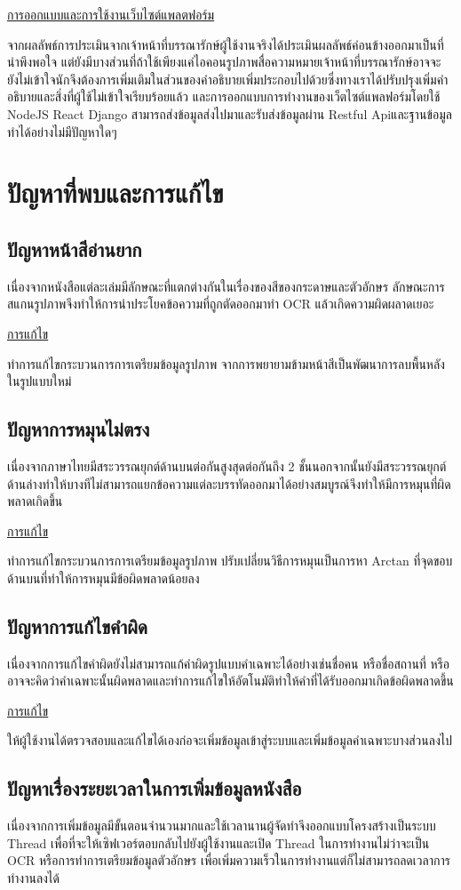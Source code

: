 \underline{การออกแบบและการใช้งานเว็บไซต์แพลตฟอร์ม}

จากผลลัพธ์การประเมินจากเจ้าหน้าที่บรรณารักษ์ผู้ใช้งานจริงได้ประเมินผลลัพธ์ค่อนข้างออกมาเป็นที่น่าพึงพอใจ แต่ยังมีบางส่วนที่ถ้าใช้เพียงแค่ไอคอนรูปภาพสื่อความหมายเจ้าหน้าที่บรรณารักษ์อาจจะ
ยังไม่เข้าใจนักจึงต้องการเพิ่มเติมในส่วนของคำอธิบายเพิ่มประกอบไปด้วยซึ่งทางเราได้ปรับปรุงเพิ่มคำอธิบายและสิ่งที่ผู้ใช้ไม่เข้าใจเรียบร้อยแล้ว
และการออกแบบการทำงานของเว็ตไซต์แพลฟอร์มโดยใช้ NodeJS React Django สามารถส่งข้อมูลส่งไปมาและรับส่งข้อมูลผ่าน Restful Apiและฐานข้อมูลทำได้อย่างไม่มีปัญหาใดๆ

\section{ปัญหาที่พบและการแก้ไข}
\subsection{ปัญหาหน้าสีอ่านยาก}
เนื่องจากหนังสือแต่ละเล่มมีลักษณะที่แตกต่างกันในเรื่องของสีของกระดาษและตัวอักษร ลักษณะการสแกนรูปภาพจึงทำให้การนำประโยคข้อความที่ถูกตัดออกมาทำ OCR แล้วเกิดความผิดผลาดเยอะ

\underline{การแก้ไข}

	ทำการแก้ไขกระบวนการการเตรียมข้อมูลรูปภาพ จากการพยายามข้ามหน้าสีเป็นพัฒนาการลบพื้นหลังในรูปแบบใหม่
\subsection{ปัญหาการหมุนไม่ตรง}
เนื่องจากภาษาไทยมีสระวรรณยุกต์ด้านบนต่อกันสูงสุดต่อกันถึง 2 ชั้นนอกจากนั้นยังมีสระวรรณยุกต์ด้านล่างทำให้บางทีไม่สามารถแยกข้อความแต่ละบรรทัดออกมาได้อย่างสมบูรณ์จึงทำให้มีการหมุนที่ผิดพลาดเกิดขึ้น

\underline{การแก้ไข}

	ทำการแก้ไขกระบวนการการเตรียมข้อมูลรูปภาพ ปรับเปลี่ยนวิธีการหมุนเป็นการหา Arctan ที่จุดขอบด้านบนที่ทำให้การหมุนมีข้อผิดพลาดน้อยลง
\subsection{ปัญหาการแก้ไขคำผิด}
เนื่องจากการแก้ไขคำผิดยังไม่สามารถแก้คำผิดรูปแบบคำเฉพาะได้อย่างเช่นชื่อคน หรือชื่อสถานที่ หรืออาจจะคิดว่าคำเฉพาะนั้นผิดพลาดและทำการแก้ไขให้อัตโนมัติทำให้คำที่ได้รับออกมาเกิดข้อผิดพลาดขึ้น

\underline{การแก้ไข}

	ให้ผู้ใช้งานได้ตรวจสอบและแก้ไขได้เองก่อจะเพิ่มข้อมูลเข้าสู่ระบบและเพิ่มข้อมูลคำเฉพาะบางส่วนลงไป
\subsection{ปัญหาเรื่องระยะเวลาในการเพิ่มข้อมูลหนังสือ}
เนื่องจากการเพิ่มข้อมูลมีขั้นตอนจำนวนมากและใช้เวลานานผู้จัดทำจึงออกแบบโครงสร้างเป็นระบบ Thread เพื่อที่จะให้เซิฟเวอร์ตอบกลับไปยังผู้ใช้งานและเปิด Thread ในการทำงานไม่ว่าจะเป็น OCR หรือการทำการเตรียมข้อมูลตัวอักษร เพื่อเพิ่มความเร็วในการทำงานแต่ก็ไม่สามารถลดเวลาการทำงานลงได้

